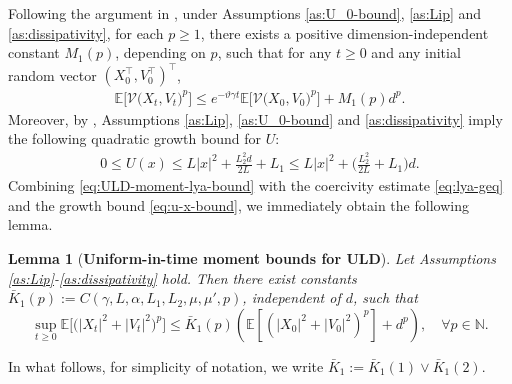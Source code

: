 \documentclass[12pt]{article}
\newenvironment{redtext}
  {\color{black}\ignorespaces}
  {\ignorespacesafterend}
\numberwithin{equation}{section}
\newtheorem{lem}{Lemma}[section]
\begin{document}
Following the argument in \cite[Lemma 3.1]{Xu2024error}, under Assumptions \ref{as:U_0-bound}, \ref{as:Lip} and \ref{as:dissipativity}, for each $p \geq 1$, there exists a positive dimension-independent constant $M_1(p)$, depending on $p$, such that for any $t \geq 0$ and any initial random vector $(X_0^\top,V_0^\top)^\top$,
\begin{align}\label{eq:ULD-moment-lya-bound}
\mathbb{E}
\Big[
\mathcal{V}
\big(
X_t, V_t
\big)^p
\Big] 
\leq 
e^{-\vartheta \gamma t} 
\mathbb{E}
\Big[
\mathcal{V}
\big(
X_0, V_0
\big)^p
\Big]
+ M_1(p) d^p.
\end{align}
Moreover, by \cite[Lemma 2]{raginsky2017non}, Assumptions \ref{as:Lip}, \ref{as:U_0-bound} and  \ref{as:dissipativity} imply the following quadratic growth bound for $U$:
\begin{align}\label{eq:u-x-bound}
0
\leq 
    U(x)\leq L|x|^2+\tfrac{L^2_2d}{2L}+L_1\leq L|x|^2+\big(\tfrac{L^2_2}{2L}+L_1\big)d .
\end{align}
Combining \eqref{eq:ULD-moment-lya-bound} with the coercivity estimate \eqref{eq:lya-geq} and the growth bound \eqref{eq:u-x-bound}, we immediately obtain the following lemma.
\begin{lem}[\textbf{Uniform-in-time moment bounds for ULD}]
\label{lem:ULD-moment bound}
Let Assumptions \ref{as:Lip}-\ref{as:dissipativity} hold.  Then there exist constants $\bar{K}_1(p):=C(\gamma, L, \alpha, L_1, L_2, \mu, \mu', p)$, independent of $d$, such that
\begin{redtext}
\begin{equation}\label{eq:moment-bound-4}
\sup_{ t \geq 0}
\mathbb{E}
\Big[
\big(
| X_t |^2
+
| V_t |^2
\big)^{p}
\Big]
\le
\bar K_1(p)
\left(
\mathbb E
\left[
\left(
|X_0|^2+|V_0|^2
\right)^p
\right]
+d^p
\right)
, \quad 
\forall p \in \mathbb{N}.
\end{equation}
\end{redtext}
\end{lem}
\begin{redtext}
In what follows, for simplicity of notation, we write
$\bar K_1:=\bar K_1(1) \vee \bar K_1(2)$. 
\end{redtext}
\end{document}
